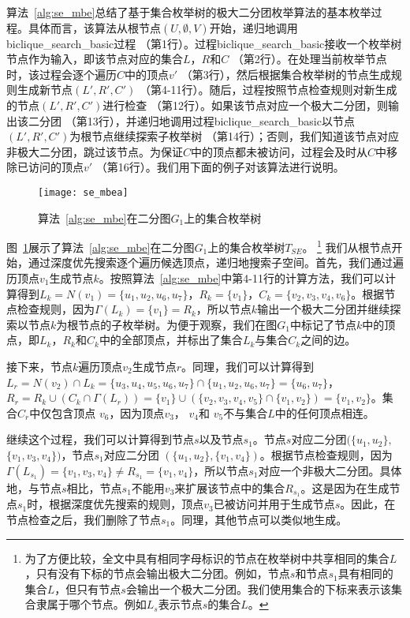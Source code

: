 算法~\ref{alg:se_mbe}总结了基于集合枚举树的极大二分团枚举算法的基本枚举过程。具体而言，该算法从根节点$(U,\emptyset,V)$开始，递归地调用\textsf{biclique\_search\_basic}过程 （第1行）。过程\textsf{biclique\_search\_basic}接收一个枚举树节点作为输入，即该节点对应的集合$L$，$R$和$C$ （第2行）。在处理当前枚举节点时，该过程会逐个遍历$C$中的顶点$v'$ （第3行），然后根据集合枚举树的节点生成规则生成新节点$(L',R',C')$ （第4-11行）。随后，过程按照节点检查规则对新生成的节点$(L',R',C')$进行检查 （第12行）。如果该节点对应一个极大二分团，则输出该二分团 （第13行），并递归地调用过程\textsf{biclique\_search\_basic}以节点$(L',R',C')$为根节点继续探索子枚举树 （第14行）；否则，我们知道该节点对应非极大二分团，跳过该节点。为保证$C$中的顶点都未被访问，过程会及时从$C$中移除已访问的顶点$v'$ （第16行）。我们用下面的例子对该算法进行说明。


\begin{figure} [ht]
  \vspace{0.1 in}
  \centering
  \texttt{[image: se\_mbea]}
  \vspace{0.1 in}
  \caption{算法~\ref{alg:se_mbe}在二分图$G_1$上的集合枚举树}
  \label{fig:se_mbea}
\end{figure}

\begin{example}
  \label{example:se}
  图~\ref{fig:se_mbea}展示了算法~\ref{alg:se_mbe}在二分图$G_1$上的集合枚举树$T_{SE}$。
  \footnote{为了方便比较，全文中具有相同字母标识的节点在枚举树中共享相同的集合$L$，只有没有下标的节点会输出极大二分团。例如，节点$s$和节点$s_1$具有相同的集合$L$，但只有节点$s$会输出一个极大二分团。我们使用集合的下标来表示该集合隶属于哪个节点。例如$L_s$表示节点$s$的集合$L$。 
}
我们从根节点开始，通过深度优先搜索逐个遍历候选顶点，递归地搜索子空间。首先，我们通过遍历顶点$v_1$生成节点$k$。按照算法~\ref{alg:se_mbe}中第4-11行的计算方法，我们可以计算得到$L_k=N(v_1)=\{u_1, u_2, u_6, u_7\}$，$R_k=\{v_1\}$，$C_k=\{v_2,v_3,v_4,v_6\}$。根据节点检查规则，因为$\Gamma(L_{k}) = \{v_1\} = R_{k}$，所以节点$k$输出一个极大二分团并继续探索以节点$k$为根节点的子枚举树。为便于观察，我们在图$G_1$中标记了节点$k$中的顶点，即$L_k$，$R_k$和$C_k$中的全部顶点，并标出了集合$L_k$与集合$C_k$之间的边。

接下来，节点$k$遍历顶点$v_2$生成节点$r$。同理，我们可以计算得到$L_{r} = N(v_2) \cap L_{k} 
= \{u_3, u_4, u_5, u_6, u_7\} \cap \{u_1, u_2, u_6, u_7\} = \{u_6, u_7\}$， $R_{r} = R_{k} \cup (C_{k} \cap \Gamma(L_{r})) = \{v_1\} \cup (\{v_2, v_3, v_4, v_5\} \cap \{v_1, v_2\}) = \{v_1, v_2\}$。集合$C_{r}$中仅包含顶点 $v_6$，因为顶点$v_3$， $v_4$和 $v_5$不与集合$L$中的任何顶点相连。

继续这个过程，我们可以计算得到节点$s$以及节点$s_1$。节点$s$对应二分团$(\{u_1, u_2\},$ $\{v_1, v_3, v_4\})$，节点$s_1$对应二分团 $(\{u_1, u_2\}, \{v_1, v_4\})$。根据节点检查规则，因为$\Gamma(L_{s_1}) = \{v_1, v_3, v_4\} \neq R_{s_1} = \{v_1, v_4\}$，所以节点$s_1$对应一个非极大二分团。具体地，与节点$s$相比，节点$s_1$不能用$v_3$来扩展该节点中的集合$R_{s_1}$。这是因为在生成节点$s_1$时，根据深度优先搜索的规则，顶点$v_3$已被访问并用于生成节点$s$。因此，在节点检查之后，我们删除了节点$s_1$。同理，其他节点可以类似地生成。

\end{example}

